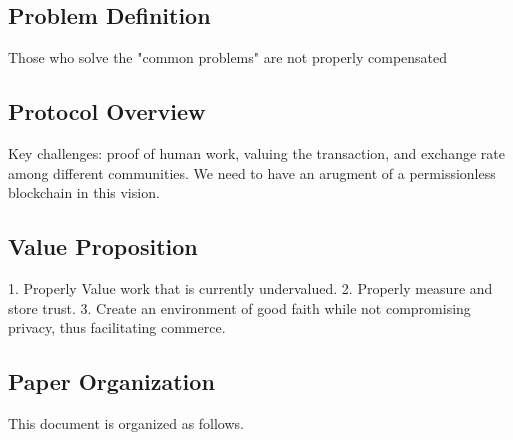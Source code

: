 % 
% 
% 
% 
% 
% 
% 

\subsection{Problem Definition}

Those who solve the "common problems" are not properly compensated

\subsection{Protocol Overview}

Key challenges: proof of human work, valuing the transaction, and exchange rate among different communities. We need to have an arugment of a permissionless blockchain in this vision. 

\subsection{Value Proposition}

1. Properly Value work that is currently undervalued. 2. Properly measure and store trust. 3. Create an environment of good faith while not compromising privacy, thus facilitating commerce. 

\subsection{Paper Organization}

This document is organized as follows.

